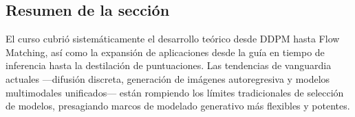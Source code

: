 \subsection{Resumen de la sección}

El curso cubrió sistemáticamente el desarrollo teórico desde DDPM hasta Flow Matching, así como la expansión de aplicaciones desde la guía en tiempo de inferencia hasta la destilación de puntuaciones. Las tendencias de vanguardia actuales —difusión discreta, generación de imágenes autoregresiva y modelos multimodales unificados— están rompiendo los límites tradicionales de selección de modelos, presagiando marcos de modelado generativo más flexibles y potentes.

\newpage
